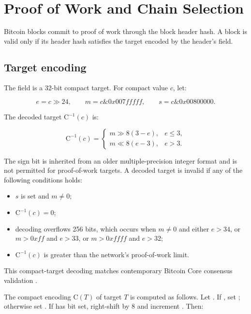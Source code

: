 \section{Proof of Work and Chain Selection}
\label{sec:pow}

Bitcoin blocks commit to proof of work through the block header hash. A block is
valid only if its header hash satisfies the target encoded by the header's
 field.

\subsection{Target encoding}

The  field is a 32-bit compact target. For compact value \(c\), let:

\[
  e = c \gg 24,\qquad
  m = c \mathbin{\&} 0x007fffff,\qquad
  s = c \mathbin{\&} 0x00800000.
\]

The decoded target \(\mathrm{C}^{-1}(c)\) is:

\[
\mathrm{C}^{-1}(c) =
\begin{cases}
  m \gg 8(3-e), & e \le 3,\\
  m \ll 8(e-3), & e > 3.
\end{cases}
\]

The sign bit is inherited from an older multiple-precision integer format and is
not permitted for proof-of-work targets. A decoded target is invalid if any of
the following conditions holds:

\begin{itemize}[leftmargin=*]
  \item \(s\) is set and \(m \ne 0\);
  \item \(\mathrm{C}^{-1}(c)=0\);
  \item decoding overflows 256 bits, which occurs when \(m \ne 0\) and either
        \(e > 34\), or \(m > 0xff\) and \(e > 33\), or \(m > 0xffff\) and \(e > 32\);
  \item \(\mathrm{C}^{-1}(c)\) is greater than the network's proof-of-work limit.
\end{itemize}

This compact-target decoding matches contemporary Bitcoin Core consensus
validation \cite{bitcoin-core-v31}.

The compact encoding \(\mathrm{C}(T)\) of target \(T\) is computed as follows. Let
. If , set
; otherwise set
. If  has bit  set,
right-shift  by 8 and increment . Then:

